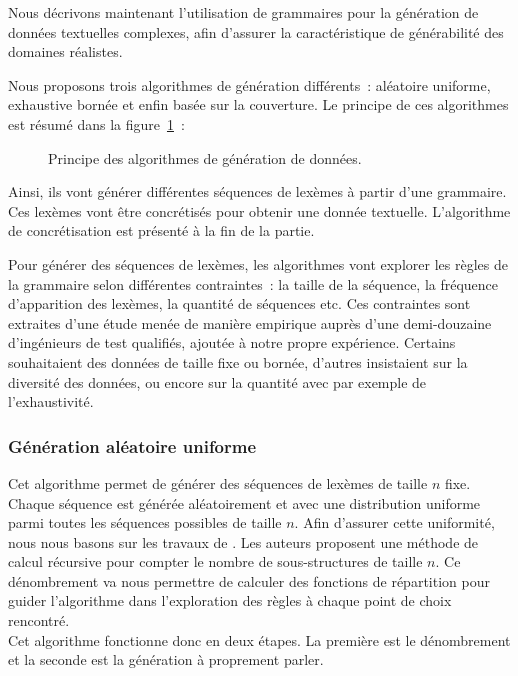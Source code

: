 Nous décrivons maintenant l'utilisation de grammaires pour la génération de
données textuelles complexes, afin d'assurer la caractéristique de générabilité
des domaines réalistes.

Nous proposons trois algorithmes de génération différents~: aléatoire uniforme,
exhaustive bornée et enfin basée sur la couverture. Le principe de ces
algorithmes est résumé dans la figure~\ref{figure:data:grammar}~:
%
\begin{figure}


\caption{\label{figure:data:grammar} Principe des algorithmes de génération de
données.}

\end{figure}
%
Ainsi, ils vont générer différentes séquences de lexèmes à partir d'une
grammaire. Ces lexèmes vont être concrétisés pour obtenir une donnée
textuelle. L'algorithme de concrétisation est présenté à la fin de la partie.

Pour générer des séquences de lexèmes, les algorithmes vont explorer les règles
de la grammaire selon différentes contraintes~: la taille de la séquence, la
fréquence d'apparition des lexèmes, la quantité de séquences etc. Ces
contraintes sont extraites d'une étude menée de manière empirique auprès d'une
demi-douzaine d'ingénieurs de test qualifiés, ajoutée à notre propre expérience.
Certains souhaitaient des données de taille fixe ou bornée, d'autres insistaient
sur la diversité des données, ou encore sur la quantité avec par exemple de
l'exhaustivité.

\subsubsection{Génération aléatoire uniforme}
\label{subsection:data:random_uniform_generation}

Cet algorithme permet de générer des séquences de lexèmes de taille $n$ fixe.
Chaque séquence est générée aléatoirement et avec une distribution uniforme
parmi toutes les séquences possibles de taille $n$. Afin d'assurer cette
uniformité, nous nous basons sur les travaux de . Les
auteurs proposent une méthode de calcul récursive pour compter le nombre de
sous-structures de taille $n$. Ce dénombrement va nous permettre de calculer des
fonctions de répartition pour guider l'algorithme dans l'exploration des règles
à chaque point de choix rencontré. \\ Cet algorithme fonctionne donc en deux
étapes. La première est le dénombrement et la seconde est la génération à
proprement parler.

